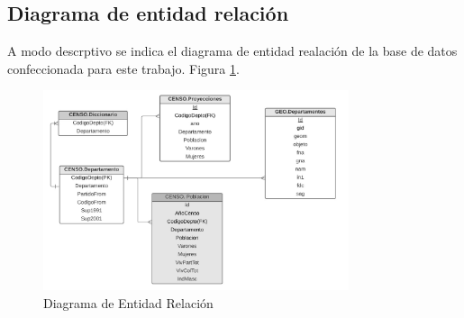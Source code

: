 \documentclass{article}
\theoremstyle{mytheoremstyle}
\theoremstyle{mytheoremstyle}
\theoremstyle{myproblemstyle}
\begin{document}
 \subsection{Diagrama de entidad relación }
  A modo descrptivo se indica el diagrama de entidad realación de la base de datos confeccionada
  para este trabajo. Figura \ref{fig:DER}.
\begin{figure}[htbp]
    \centering
    \includegraphics[width=0.8\textwidth]{img/DER.jpg}
    \caption{Diagrama de Entidad Relación}
    \label{fig:DER}
\end{figure}
\end{document}

